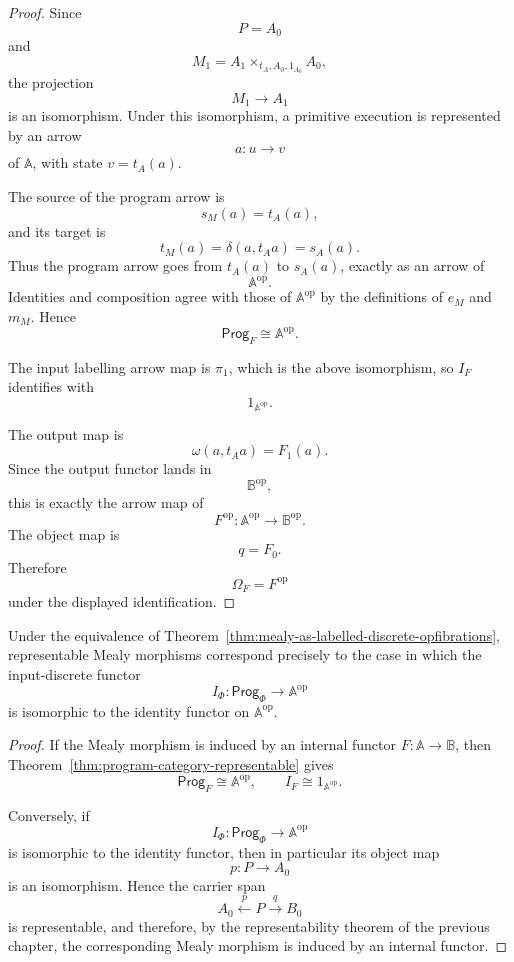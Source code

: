 \begin{proof}
Since
\[
P=A_0
\]
and
\[
M_1=A_1\times_{t_A,A_0,1_{A_0}}A_0,
\]
the projection
\[
M_1\to A_1
\]
is an isomorphism. Under this isomorphism, a primitive execution is represented by an arrow
\[
a:u\to v
\]
of \(\mathbb A\), with state \(v=t_A(a)\).

The source of the program arrow is
\[
s_M(a)=t_A(a),
\]
and its target is
\[
t_M(a)=\delta(a,t_Aa)=s_A(a).
\]
Thus the program arrow goes from \(t_A(a)\) to \(s_A(a)\), exactly as an arrow of
\[
\mathbb A^{\mathrm{op}}.
\]
Identities and composition agree with those of \(\mathbb A^{\mathrm{op}}\) by the definitions of \(e_M\) and \(m_M\). Hence
\[
\mathsf{Prog}_F\cong\mathbb A^{\mathrm{op}}.
\]

The input labelling arrow map is \(\pi_1\), which is the above isomorphism, so \(I_F\) identifies with
\[
1_{\mathbb A^{\mathrm{op}}}.
\]

The output map is
\[
\omega(a,t_Aa)=F_1(a).
\]
Since the output functor lands in
\[
\mathbb B^{\mathrm{op}},
\]
this is exactly the arrow map of
\[
F^{\mathrm{op}}:\mathbb A^{\mathrm{op}}\to\mathbb B^{\mathrm{op}}.
\]
The object map is
\[
q=F_0.
\]
Therefore
\[
\Omega_F=F^{\mathrm{op}}
\]
under the displayed identification.
\end{proof}

\begin{corollary}
\label{cor:representable-trivial-labelled-opfibrations}
Under the equivalence of Theorem~\ref{thm:mealy-as-labelled-discrete-opfibrations}, representable Mealy morphisms correspond precisely to the case in which the input-discrete functor
\[
I_\Phi:\mathsf{Prog}_\Phi\to\mathbb A^{\mathrm{op}}
\]
is isomorphic to the identity functor on \(\mathbb A^{\mathrm{op}}\).
\end{corollary}

\begin{proof}
If the Mealy morphism is induced by an internal functor \(F:\mathbb A\to\mathbb B\), then Theorem~\ref{thm:program-category-representable} gives
\[
\mathsf{Prog}_F\cong\mathbb A^{\mathrm{op}},
\qquad
I_F\cong 1_{\mathbb A^{\mathrm{op}}}.
\]

Conversely, if
\[
I_\Phi:\mathsf{Prog}_\Phi\to\mathbb A^{\mathrm{op}}
\]
is isomorphic to the identity functor, then in particular its object map
\[
p:P\to A_0
\]
is an isomorphism. Hence the carrier span
\[
A_0\xleftarrow{p}P\xrightarrow{q}B_0
\]
is representable, and therefore, by the representability theorem of the previous chapter, the corresponding Mealy morphism is induced by an internal functor.
\end{proof}

